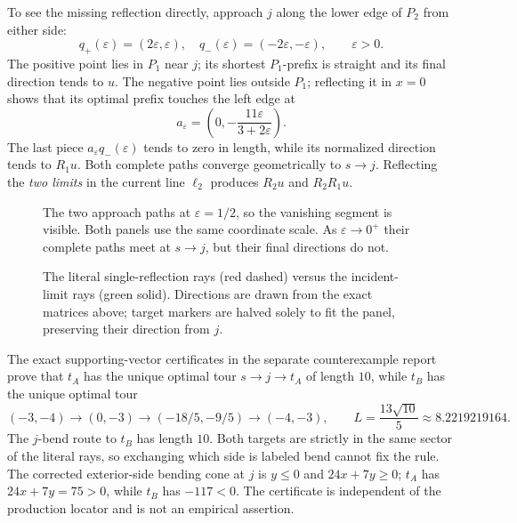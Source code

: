 \documentclass[12pt,a4paper]{article}
\begin{document}
To see the missing reflection directly, approach \(j\) along the lower edge of \(P_2\) from either side:
\[
q_+(\varepsilon)=(2\varepsilon,\varepsilon),\quad
q_-(\varepsilon)=(-2\varepsilon,-\varepsilon),\qquad\varepsilon>0.
\]
The positive point lies in \(P_1\) near \(j\); its shortest \(P_1\)-prefix is straight and its final direction tends to \(u\). The negative point lies outside \(P_1\); reflecting it in \(x=0\) shows that its optimal prefix touches the left edge at
\[
a_\varepsilon=\left(0,-\frac{11\varepsilon}{3+2\varepsilon}\right).
\]
The last piece \(a_\varepsilon q_-(\varepsilon)\) tends to zero in length, while its normalized direction tends to \(R_1u\). Both complete paths converge geometrically to \(s\to j\). Reflecting the \emph{two limits} in the current line \(\ell_2\) produces \(R_2u\) and \(R_2R_1u\).

\begin{figure}[h]\centering\figlimits\caption{The two approach paths at \(\varepsilon=1/2\), so the vanishing segment is visible. Both panels use the same coordinate scale. As \(\varepsilon\to0^+\) their complete paths meet at \(s\to j\), but their final directions do not.}\label{fig:limits}\end{figure}

\begin{figure}[h]\centering\figrays\caption{The literal single-reflection rays (red dashed) versus the incident-limit rays (green solid). Directions are drawn from the exact matrices above; target markers are halved solely to fit the panel, preserving their direction from \(j\).}\label{fig:rays}\end{figure}

The exact supporting-vector certificates in the separate counterexample report~\cite{counterexample} prove that \(t_A\) has the unique optimal tour \(s\to j\to t_A\) of length \(10\), while \(t_B\) has the unique optimal tour
\begin{equation}\label{eq:bpath}
(-3,-4)\to(0,-3)\to(-18/5,-9/5)\to(-4,-3),
\qquad L=\frac{13\sqrt{10}}5\approx8.2219219164.
\end{equation}
The \(j\)-bend route to \(t_B\) has length \(10\). Both targets are strictly in the same sector of the literal rays, so exchanging which side is labeled bend cannot fix the rule. The corrected exterior-side bending cone at \(j\) is \(y\le0\) and \(24x+7y\ge0\); \(t_A\) has \(24x+7y=75>0\), while \(t_B\) has \(-117<0\). The certificate is independent of the production locator and is not an empirical assertion.
\end{document}
